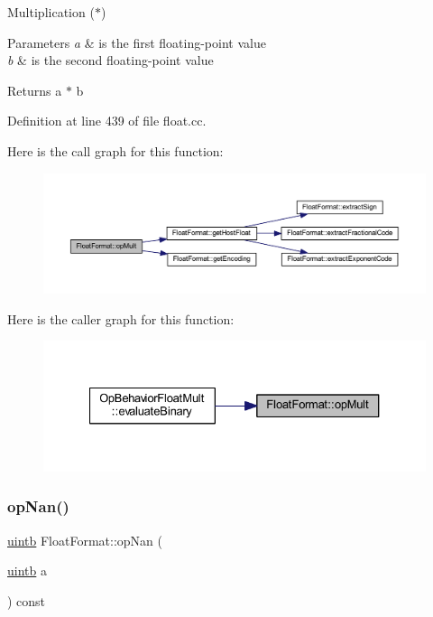 Multiplication ($\ast$) 


\begin{DoxyParams}{Parameters}
{\em a} & is the first floating-\/point value \\
\hline
{\em b} & is the second floating-\/point value \\
\hline
\end{DoxyParams}
\begin{DoxyReturn}{Returns}
a $\ast$ b 
\end{DoxyReturn}


Definition at line 439 of file float.\+cc.

Here is the call graph for this function\+:
\nopagebreak
\begin{figure}[H]
\begin{center}
\leavevmode
\includegraphics[width=350pt]{class_float_format_a289c2216fe9add39e225991fc7baad3c_cgraph}
\end{center}
\end{figure}
Here is the caller graph for this function\+:
\nopagebreak
\begin{figure}[H]
\begin{center}
\leavevmode
\includegraphics[width=327pt]{class_float_format_a289c2216fe9add39e225991fc7baad3c_icgraph}
\end{center}
\end{figure}
\mbox{\label{class_float_format_a64576b3f398b049f002a6c95e45f2296}} 
\subsubsection{\texorpdfstring{opNan()}{opNan()}}
{\footnotesize\ttfamily \mbox{\hyperlink{types_8h_a2db313c5d32a12b01d26ac9b3bca178f}{uintb}} Float\+Format\+::op\+Nan (\begin{DoxyParamCaption}\item[{\mbox{\hyperlink{types_8h_a2db313c5d32a12b01d26ac9b3bca178f}{uintb}}}]{a }\end{DoxyParamCaption}) const}



